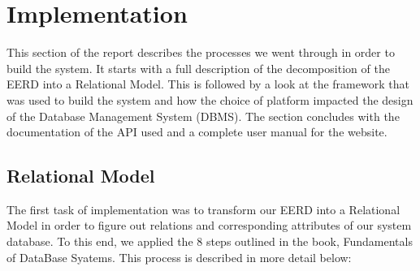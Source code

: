\documentclass[12pt,a4paper]{report}
\begin{document}
\section{Implementation}
This section of the report describes the processes we went through in order to build the system. It starts with a full description of the decomposition of the EERD into a Relational Model. This is followed by a look at the framework that was used to build the system and how the choice of platform impacted the design of the Database Management System (DBMS). The section concludes with the documentation of the API used and a complete user manual for the website.

\subsection{Relational Model}
The first task of implementation was to transform our EERD into a Relational Model in order to figure out relations and corresponding attributes of our system database. To this end, we applied the 8 steps outlined in the book, Fundamentals of DataBase Syatems\cite{EL}. This process is described in more detail below:
\end{document}
